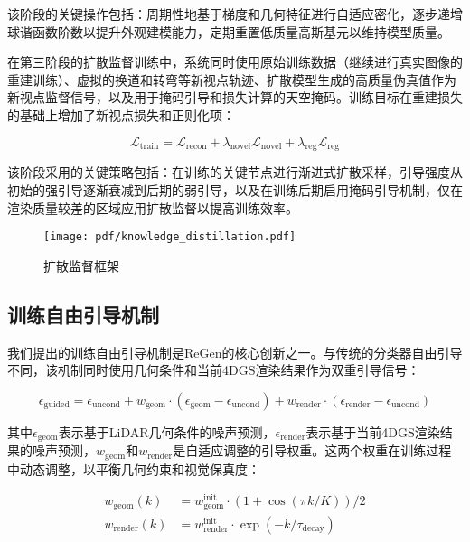 该阶段的关键操作包括：周期性地基于梯度和几何特征进行自适应密化，逐步递增球谐函数阶数以提升外观建模能力，定期重置低质量高斯基元以维持模型质量。

在第三阶段的扩散监督训练中，系统同时使用原始训练数据（继续进行真实图像的重建训练）、虚拟的换道和转弯等新视点轨迹、扩散模型生成的高质量伪真值作为新视点监督信号，以及用于掩码引导和损失计算的天空掩码。训练目标在重建损失的基础上增加了新视点损失和正则化项：

\begin{equation}
\mathcal{L}_{\text{train}} = \mathcal{L}_{\text{recon}} + \lambda_{\text{novel}} \mathcal{L}_{\text{novel}} + \lambda_{\text{reg}} \mathcal{L}_{\text{reg}}
\label{eq:diffusion_supervised_training}
\end{equation}

该阶段采用的关键策略包括：在训练的关键节点进行渐进式扩散采样，引导强度从初始的强引导逐渐衰减到后期的弱引导，以及在训练后期启用掩码引导机制，仅在渲染质量较差的区域应用扩散监督以提高训练效率。

\begin{figure}[htbp]
  \centering
  \texttt{[image: pdf/knowledge\_distillation.pdf]}
  \caption{扩散监督框架}
  \label{fig:diffusion-supervision}
\end{figure}

\subsection{训练自由引导机制}

我们提出的训练自由引导机制是ReGen的核心创新之一。与传统的分类器自由引导不同，该机制同时使用几何条件和当前4DGS渲染结果作为双重引导信号：

\begin{equation}
\epsilon_{\text{guided}} = \epsilon_{\text{uncond}} + w_{\text{geom}} \cdot (\epsilon_{\text{geom}} - \epsilon_{\text{uncond}}) + w_{\text{render}} \cdot (\epsilon_{\text{render}} - \epsilon_{\text{uncond}})
\label{eq:dual_guidance}
\end{equation}

其中$\epsilon_{\text{geom}}$表示基于LiDAR几何条件的噪声预测，$\epsilon_{\text{render}}$表示基于当前4DGS渲染结果的噪声预测，$w_{\text{geom}}$和$w_{\text{render}}$是自适应调整的引导权重。这两个权重在训练过程中动态调整，以平衡几何约束和视觉保真度：

\begin{align}
w_{\text{geom}}(k) &= w_{\text{geom}}^{\text{init}} \cdot (1 + \cos(\pi k / K)) / 2 \\
w_{\text{render}}(k) &= w_{\text{render}}^{\text{init}} \cdot \exp(-k / \tau_{\text{decay}})
\label{eq:adaptive_guidance_weights}
\end{align}

